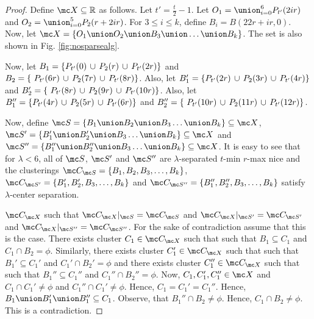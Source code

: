 \documentclass[11pt]{article}
\begin{document}
\begin{proof}
Define $\mc X \subseteq \mathbb{R}$ as follows. Let $t' = \frac{t}{2}-1$. Let $O_1 = \union_{i=0}^6 P_{t'}(2ir)$ and $O_2 = \union_{i=0}^5 P_2(r+2ir)$. For $3\le i\le k$, define $B_i = B(22r+ir, 0)$. Now, let $\mc X = \{O_1 \union O_2 \union B_3 \union \ldots \union B_k\}$. The set is also shown in Fig. \ref{fig:nosparsealg}.

Now, let $B_1 = \{P_{t'}(0) \thinspace\cup\thinspace  P_{2}(r) \thinspace\cup\thinspace P_{t'}(2r) \}$ and $B_2 = \{\ P_{t'}(6r) \thinspace\cup\thinspace P_{2}(7r)\thinspace\cup\thinspace P_{t'}(8r)\}$. Also, let $B_1' = \{P_{t'}(2r) \thinspace\cup\thinspace  P_{2}(3r) \thinspace\cup\thinspace P_{t'}(4r) \}$ and $B_2' = \{\ P_{t'}(8r) \thinspace\cup\thinspace P_{2}(9r)\thinspace\cup\thinspace P_{t'}(10r)\}$. Also, let $B_1'' = \{P_{t'}(4r) \thinspace\cup\thinspace  P_{2}(5r) \thinspace\cup\thinspace P_{t'}(6r) \}$ and $B_2'' = \{\ P_{t'}(10r) \thinspace\cup\thinspace P_{2}(11r)\thinspace\cup\thinspace P_{t'}(12r)\}$. 

Now, define $\mc S = \{B_1 \union B_2 \union B_3\ldots \union B_k\} \subseteq \mc X$, $\mc S' = \{B_1' \union B_2' \union B_3\ldots \union B_k\} \subseteq \mc X$ and $\mc S'' = \{B_1'' \union B_2'' \union B_3\ldots \union B_k\} \subseteq \mc X$. It is easy to see that for $\lambda < 6$, all of $\mc S$, $\mc S'$ and $\mc S''$ are $\lambda$-separated $t$-min $r$-max nice and the clusterings $\mc C_{\mc S} = \{B_1, B_2, B_3, \ldots, B_k\}$, $\mc C_{\mc S'} = \{B_1', B_2', B_3, \ldots, B_k\}$ and $\mc C_{\mc S''} = \{B_1'', B_2'', B_3, \ldots, B_k\}$ satisfy $\lambda$-center separation.

$\mc C_{\mc X}$ such that $\mc C_{\mc X}|_{\mc S} = \mc C_{\mc S}$ and $\mc C_{\mc X}|_{\mc S'} = \mc C_{\mc S'}$ and $\mc C_{\mc X}|_{\mc S''} = \mc C_{\mc S''}$. For the sake of contradiction assume that this is the case. There exists cluster $C_1 \in \mc C_{\mc X}$ such that such that $B_1 \subseteq C_1$ and $C_1 \cap B_2 = \phi$. Similarly, there exists cluster $C_1' \in \mc C_{\mc X}$ such that such that $B_1' \subseteq C_1'$ and $C_1' \cap B_2' = \phi$ and there exists cluster $C_1'' \in \mc C_{\mc X}$ such that such that $B_1'' \subseteq C_1''$ and $C_1'' \cap B_2'' = \phi$. Now, $C_1, C_1', C_1'' \in \mc X$ and $C_1 \cap C_1' \neq \phi$ and $C_1'' \cap C_1' \neq \phi$. Hence, $C_1 = C_1' = C_1''$. Hence, $B_1 \union B_1' \union B_1'' \subseteq C_1$. Observe, that $B_1'' \cap B_2 \neq \phi$. Hence, $C_1\cap B_2 \neq \phi$. This is a contradiction.
\end{proof}


































\end{document}
